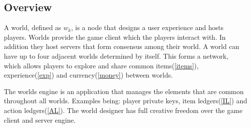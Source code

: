 \documentclass[runningheads,a4paper]{llncs}
\begin{document}
\subsection{Overview}

A world, defined as $w_k$, is a node that designs a user experience and hosts players. Worlds provide the game client which the players interact with. In addition they host servers that form consensus among their world. A world can have up to four adjacent worlds determined by itself. This forms a network, which allows players to explore and share common items(\ref{items}), experience(\ref{exp}) and currency(\ref{money}) between worlds.

\begin{small}
\begin{center}
\end{center}
\end{small}
The worlds engine is an application that manages the elements that are common throughout all worlds. Examples being: player private keys, item ledgers(\ref{IL}) and action ledgers(\ref{AL}). The world designer has full creative freedom over the game client and server engine. 
\end{document}
